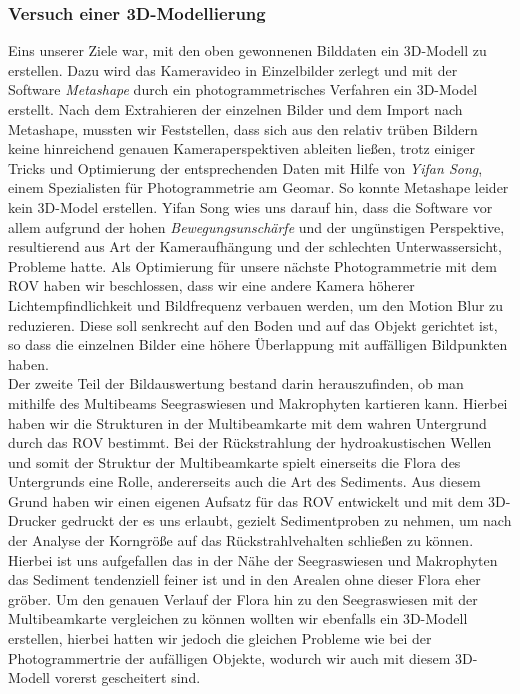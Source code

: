 \subsubsection{Versuch einer 3D-Modellierung}
Eins unserer Ziele war, mit den oben gewonnenen Bilddaten ein 3D-Modell zu erstellen. Dazu wird das Kameravideo in Einzelbilder zerlegt und mit der Software \emph{Metashape} durch ein photogrammetrisches Verfahren ein 3D-Model erstellt. 
Nach dem Extrahieren der einzelnen Bilder und dem Import nach Metashape, mussten wir Feststellen, dass sich aus den relativ trüben Bildern keine hinreichend genauen Kameraperspektiven ableiten ließen, trotz einiger Tricks und Optimierung der entsprechenden Daten mit Hilfe von \emph{Yifan Song}, einem Spezialisten für Photogrammetrie am Geomar. So konnte Metashape leider kein 3D-Model erstellen.
Yifan Song wies uns darauf hin, dass die Software vor allem aufgrund der hohen \emph{Bewegungsunschärfe} und der ungünstigen Perspektive, resultierend aus Art der Kameraufhängung und der schlechten Unterwassersicht, Probleme hatte. 
Als Optimierung für unsere nächste Photogrammetrie mit dem ROV haben wir beschlossen, dass wir eine andere Kamera höherer Lichtempfindlichkeit und Bildfrequenz verbauen werden, um den Motion Blur zu reduzieren. Diese soll senkrecht auf den Boden und auf das Objekt gerichtet ist, so dass die einzelnen Bilder eine höhere Überlappung mit auffälligen Bildpunkten haben.
\\

Der zweite Teil der Bildauswertung bestand darin herauszufinden, ob man mithilfe des Multibeams Seegraswiesen und Makrophyten kartieren kann. Hierbei haben wir die Strukturen in der Multibeamkarte mit dem wahren Untergrund durch das ROV bestimmt.
Bei der Rückstrahlung der hydroakustischen Wellen und somit der Struktur der Multibeamkarte spielt einerseits die Flora des Untergrunds eine Rolle, andererseits auch die Art des Sediments.
Aus diesem Grund haben wir einen eigenen Aufsatz für das ROV entwickelt und mit dem 3D-Drucker gedruckt der es uns erlaubt, gezielt Sedimentproben zu nehmen, um nach der Analyse der Korngröße auf das Rückstrahlvehalten schließen zu können.
Hierbei ist uns aufgefallen das in der Nähe der Seegraswiesen und Makrophyten das Sediment tendenziell feiner ist und in den Arealen ohne dieser Flora eher gröber.
Um den genauen Verlauf der Flora hin zu den Seegraswiesen mit der Multibeamkarte vergleichen zu können wollten wir ebenfalls ein 3D-Modell erstellen, hierbei hatten wir jedoch die gleichen Probleme wie bei der Photogrammertrie der aufälligen Objekte, wodurch wir auch mit diesem 3D-Modell vorerst gescheitert sind.

